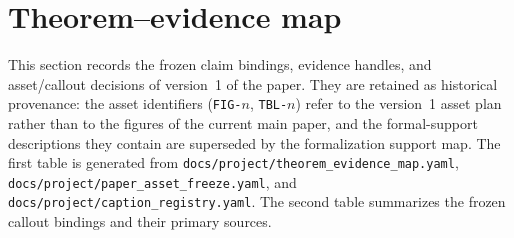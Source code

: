 \section{Theorem--evidence map}
This section records the frozen claim bindings, evidence handles, and asset/callout decisions of version~1 of the paper.
They are retained as historical provenance: the asset identifiers (\texttt{FIG-}$n$, \texttt{TBL-}$n$) refer to the version~1 asset plan rather than to the figures of the current main paper, and the formal-support descriptions they contain are superseded by the formalization support map.
The first table is generated from \texttt{docs/project/theorem\_evidence\_map.yaml}, \texttt{docs/project/paper\_asset\_freeze.yaml}, and \texttt{docs/project/caption\_registry.yaml}.
The second table summarizes the frozen callout bindings and their primary sources.




